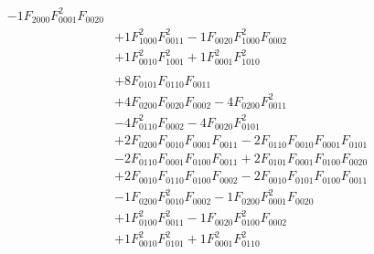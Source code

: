 \documentclass[12pt]{article}
\begin{document}
\begin{equation}
\begin{aligned}
-1 F_{2000} F_{0001}^2 F_{0020}
\\ &
+1 F_{1000}^2 F_{0011}^2
-1 F_{0020} F_{1000}^2 F_{0002}
\\ &
+1 F_{0010}^2 F_{1001}^2
+1 F_{0001}^2 F_{1010}^2
\\ &
\\ &
+8 F_{0101} F_{0110} F_{0011}
\\ &
+4 F_{0200} F_{0020} F_{0002}
-4 F_{0200} F_{0011}^2
\\ &
-4 F_{0110}^2 F_{0002}
-4 F_{0020} F_{0101}^2
\\ &
+2 F_{0200} F_{0010} F_{0001} F_{0011}
-2 F_{0110} F_{0010} F_{0001} F_{0101}
\\ &
-2 F_{0110} F_{0001} F_{0100} F_{0011}
+2 F_{0101} F_{0001} F_{0100} F_{0020}
\\ &
+2 F_{0010} F_{0110} F_{0100} F_{0002}
-2 F_{0010} F_{0101} F_{0100} F_{0011}
\\ &
-1 F_{0200} F_{0010}^2 F_{0002}
-1 F_{0200} F_{0001}^2 F_{0020}
\\ &
+1 F_{0100}^2 F_{0011}^2
-1 F_{0020} F_{0100}^2 F_{0002}
\\ &
+1 F_{0010}^2 F_{0101}^2
+1 F_{0001}^2 F_{0110}^2
\end{aligned}
\end{equation}

\newpage
{\small\singlespacing}
\end{document}
